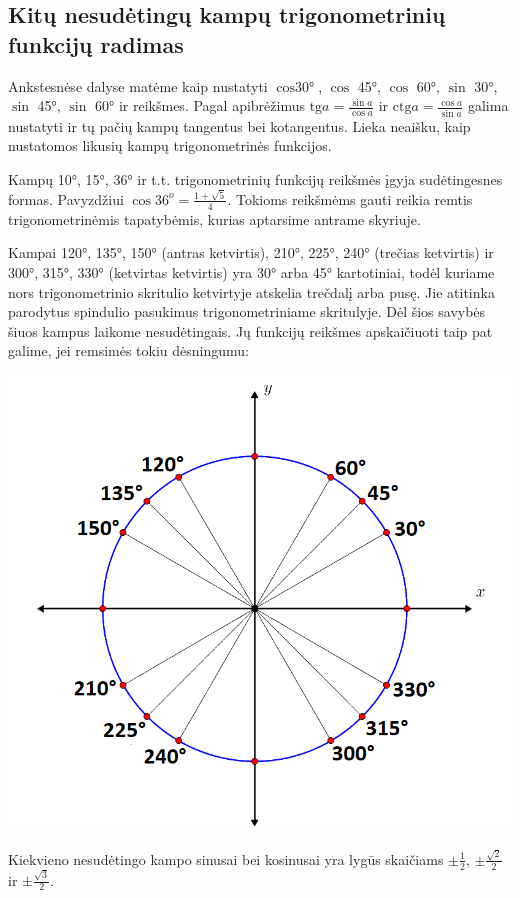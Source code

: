 \documentclass[a4paper]{article}
\begin{document}
\subsection{Kitų nesudėtingų kampų trigonometrinių funkcijų radimas}
Ankstesnėse dalyse matėme kaip nustatyti $\cos\text{30°}$, $\cos$ 45°, $\cos$ 60°, $\sin$ 30°, $\sin$ 45°, $\sin$ 60° ir reikšmes. Pagal apibrėžimus $\text{tg}a=\frac{\sin a}{\cos a}$ ir $\text{ctg}a=\frac{\cos a}{\sin a}$ galima nustatyti ir tų pačių kampų tangentus bei kotangentus. Lieka neaišku, kaip nustatomos likusių kampų trigonometrinės funkcijos.
\begin{enumerate}
\begin{minipage}[b]{0.65\linewidth}
\item Kampų 10°, 15°, 36° ir t.t. trigonometrinių funkcijų reikšmės įgyja sudėtingesnes formas. Pavyzdžiui $\cos 36^o = \frac{1+\sqrt{5}}{4}$. Tokioms reikšmėms gauti reikia remtis trigonometrinėmis tapatybėmis, kurias aptarsime antrame skyriuje.
\item Kampai 120°, 135°, 150° (antras ketvirtis), 210°, 225°, 240° (trečias ketvirtis) ir 300°, 315°, 330° (ketvirtas ketvirtis) yra 30° arba 45° kartotiniai, todėl kuriame nors trigonometrinio skritulio ketvirtyje atskelia trečdalį arba pusę. Jie atitinka parodytus spindulio pasukimus trigonometriniame skritulyje. Dėl šios savybės šiuos kampus laikome nesudėtingais. Jų funkcijų reikšmes apskaičiuoti taip pat galime, jei remsimės tokiu dėsningumu:
\end{minipage}
\begin{minipage}[b]{0.35\linewidth}
\includegraphics[width=\textwidth]{easy_angles.png}
\end{minipage}
\end{enumerate}
\begin{mdframed}[backgroundcolor=yellow!50!white]
Kiekvieno nesudėtingo kampo sinusai bei kosinusai yra lygūs skaičiams $\pm \frac{1}{2}$, $\pm \frac{\sqrt{2}}{2}$ ir $\pm \frac{\sqrt{3}}{2}$.
\end{mdframed}
\end{document}
